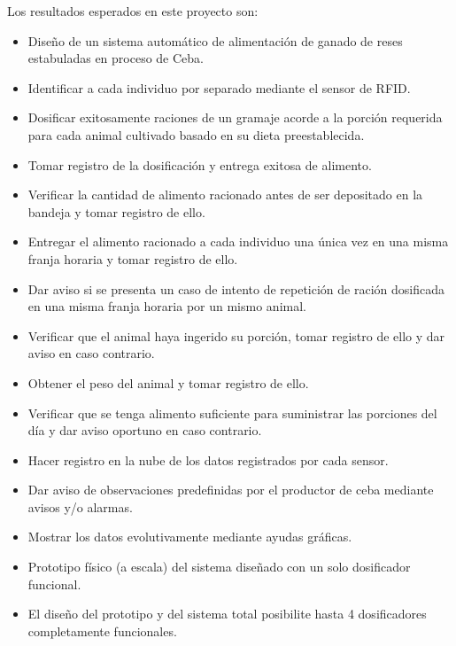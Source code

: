  Los resultados esperados en este proyecto son:
 \begin{itemize}
 	\item Diseño de un sistema automático de alimentación de ganado de reses estabuladas en proceso de Ceba.
 	\item Identificar a cada individuo por separado mediante el sensor de RFID.
 	\item Dosificar exitosamente raciones de un gramaje acorde a la porción requerida para cada animal cultivado basado en su dieta preestablecida.
 	\item Tomar registro de la dosificación y entrega exitosa de alimento.
 	\item Verificar la cantidad de alimento racionado antes de ser depositado en la bandeja y tomar registro de ello.
 	\item Entregar el alimento racionado a cada individuo una única vez en una misma franja horaria y tomar registro de ello.
 	\item Dar aviso si se presenta un caso de intento de repetición de ración dosificada en una misma franja horaria por un mismo animal.
 	\item Verificar que el animal haya ingerido su porción, tomar registro de ello y dar aviso en caso contrario. 	
 	\item Obtener el peso del animal y tomar registro de ello.
 	\item Verificar que se tenga alimento suficiente para suministrar las porciones del día y dar aviso oportuno en caso contrario.
 	\item Hacer registro en la nube de los datos registrados por cada sensor.
 	\item Dar aviso de observaciones predefinidas por el productor de ceba mediante avisos y/o alarmas.
 	\item Mostrar los datos evolutivamente mediante ayudas gráficas.
 	\item Prototipo físico (a escala) del sistema diseñado con un solo dosificador funcional.
 	\item El diseño del prototipo y del sistema total posibilite hasta 4 dosificadores completamente funcionales.

\end{itemize}
